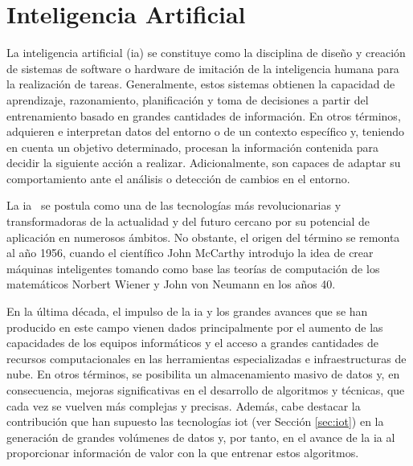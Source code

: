 \section{Inteligencia Artificial}
\label{sec:iateoria}

La inteligencia artificial (\gls{ia}) \cite{iagov} \cite{iaazure} se constituye como la disciplina de diseño y creación de sistemas de software o hardware de imitación de la inteligencia humana para la realización de tareas. Generalmente, estos sistemas obtienen la capacidad de aprendizaje, razonamiento, planificación y toma de decisiones a partir del entrenamiento basado en grandes cantidades de información. En otros términos, adquieren e interpretan datos del entorno o de un contexto específico y, teniendo en cuenta un objetivo determinado, procesan la información contenida para decidir la siguiente acción a realizar. Adicionalmente, son capaces de adaptar su comportamiento ante el análisis o detección de cambios en el entorno. 

\vspace{3mm}

La \gls{ia}~\cite{iagov} se postula como una de las tecnologías más revolucionarias y transformadoras de la actualidad y del futuro cercano por su potencial de aplicación en numerosos ámbitos. No obstante, el origen del término se remonta al año 1956, cuando el científico John McCarthy introdujo la idea de crear máquinas inteligentes tomando como base las teorías de computación de los matemáticos Norbert Wiener y John von Neumann en los años 40.

\vspace{3mm}

En la última década, el impulso de la \gls{ia} y los grandes avances que se han producido en este campo vienen dados principalmente por el aumento de las capacidades de los equipos informáticos y el acceso a grandes cantidades de recursos computacionales en las herramientas especializadas e infraestructuras de nube. En otros términos, se posibilita un almacenamiento masivo de datos y, en consecuencia, mejoras significativas en el desarrollo de algoritmos y técnicas, que cada vez se vuelven más complejas y precisas. Además, cabe destacar la contribución que han supuesto las tecnologías \gls{iot} (ver Sección \ref{sec:iot}) en la generación de grandes volúmenes de datos y, por tanto, en el avance de la \gls{ia} al proporcionar información de valor con la que entrenar estos algoritmos.

